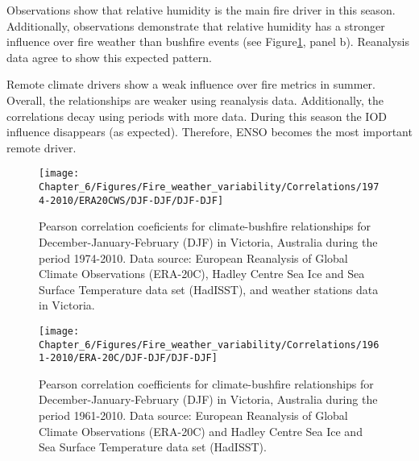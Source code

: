 Observations show that relative humidity is the main fire driver in
this season. Additionally, observations demonstrate that relative
humidity has a stronger influence over fire weather than bushfire
events (see Figure\ref{fig:Pearson correlation coefficients for climate-bushfire relationships for December-January-February in Victoria, Australia during the period 1974-2010 (r)},
panel b). Reanalysis data agree to show this expected pattern. 

Remote climate drivers show a weak influence over fire metrics in
summer. Overall, the relationships are weaker using reanalysis data.
Additionally, the correlations decay using periods with more data.
During this season the IOD influence disappears (as expected). Therefore,
ENSO becomes the most important remote driver. 

\begin{figure}[h]
\noindent \begin{centering}
\texttt{[image: Chapter\_6/Figures/Fire\_weather\_variability/Correlations/1974-2010/ERA20CWS/DJF-DJF/DJF-DJF]}
\par\end{centering}

\caption[Pearson correlation coeficients for climate-bushfire relationships
for December-January-February (DJF) in Victoria, Australia during
the period 1974-2010]{Pearson correlation coeficients for climate-bushfire relationships
for December-January-February (DJF) in Victoria, Australia during
the period 1974-2010. Data source: European Reanalysis of Global Climate
Observations (ERA-20C), Hadley Centre Sea Ice and Sea Surface Temperature
data set (HadISST), and weather stations data in Victoria. \label{fig:Pearson correlation coefficients for climate-bushfire relationships for December-January-February in Victoria, Australia during the period 1974-2010 (r)}}
\end{figure}


\begin{figure}[h]
\noindent \begin{centering}
\texttt{[image: Chapter\_6/Figures/Fire\_weather\_variability/Correlations/1961-2010/ERA-20C/DJF-DJF/DJF-DJF]}
\par\end{centering}

\caption[Pearson correlation coefficients for climate-bushfire relationships
for December-January-February (DJF) in Victoria, Australia during
the period 1961-2010]{Pearson correlation coefficients for climate-bushfire relationships
for December-January-February (DJF) in Victoria, Australia during
the period 1961-2010. Data source: European Reanalysis of Global Climate
Observations (ERA-20C) and Hadley Centre Sea Ice and Sea Surface Temperature
data set (HadISST). \label{fig:Pearson correlation coefficients for climate-bushfire relationships for December-January-February in Victoria, Australia during the period 1961-2010 (r)}}
\end{figure}


